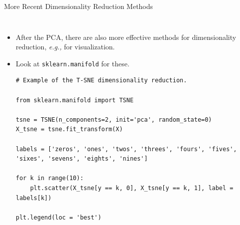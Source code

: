 \documentclass[10pt, aspectratio=169]{beamer} %
\begin{document}
\begin{frame}[fragile, allowframebreaks=0.8]{More Recent Dimensionality Reduction Methods}
		\begin{columns}
	    \begin{itemize}
\item After the PCA, there are also more effective methods for dimensionality reduction, \emph{e.g.,} for visualization.
\item Look at \verb+sklearn.manifold+ for these.

\begin{lstlisting}
# Example of the T-SNE dimensionality reduction.

from sklearn.manifold import TSNE

tsne = TSNE(n_components=2, init='pca', random_state=0)
X_tsne = tsne.fit_transform(X)

labels = ['zeros', 'ones', 'twos', 'threes', 'fours', 'fives', 'sixes', 'sevens', 'eights', 'nines']

for k in range(10):
    plt.scatter(X_tsne[y == k, 0], X_tsne[y == k, 1], label = labels[k])

plt.legend(loc = 'best')
\end{lstlisting}

\end{itemize}
			

\end{columns}
\end{frame}
\end{document}
